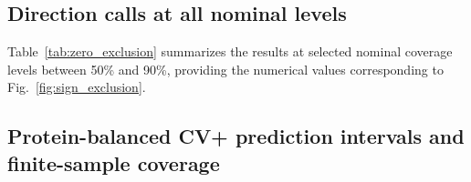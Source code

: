 \documentclass[11pt]{article}
\begin{document}






\subsection{Direction calls at all nominal levels}
\label{app:direction_calls}

Table~\ref{tab:zero_exclusion}
summarizes the results at selected nominal coverage levels between 50\% and 90\%, providing the numerical values corresponding to Fig.~\ref{fig:sign_exclusion}.












\subsection{Protein-balanced CV+ prediction intervals and finite-sample coverage}
\label{sec:protein-balanced-cvplus}
\end{document}
